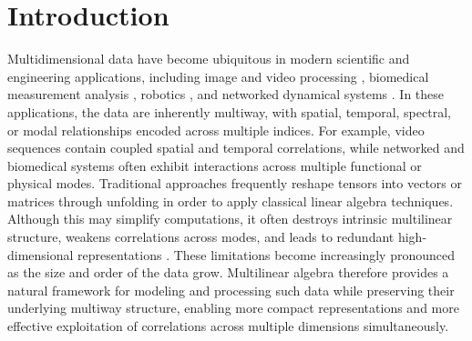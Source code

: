 \documentclass[onefignum,onetabnum]{siamart250211}
\begin{document}
\section{Introduction}
Multidimensional data have become ubiquitous in modern scientific and engineering applications, including image and video processing \cite{ahmadi2023fast,woods2011multidimensional,xia2024tensor}, biomedical measurement analysis \cite{azam2022review,sedighin2024tensor}, robotics \cite{shetty2024tensor,wijesoma2006toward}, and networked dynamical systems \cite{chen2022explicit,chen2021controllability,shen2017tensor}. In these applications, the data are inherently multiway, with spatial, temporal, spectral, or modal relationships encoded across multiple indices. For example, video sequences contain coupled spatial and temporal correlations, while networked and biomedical systems often exhibit interactions across multiple functional or physical modes. Traditional approaches frequently reshape tensors into vectors or matrices through unfolding in order to apply classical linear algebra techniques. Although this may simplify computations, it often destroys intrinsic multilinear structure, weakens correlations across modes, and leads to redundant high-dimensional representations \cite{chen2021multilinear,ma2026online,rogers2013multilinear}. These limitations become increasingly pronounced as the size and order of the data grow. Multilinear algebra therefore provides a natural framework for modeling and processing such data while preserving their underlying multiway structure, enabling more compact representations and more effective exploitation of correlations across multiple dimensions simultaneously.
\end{document}
